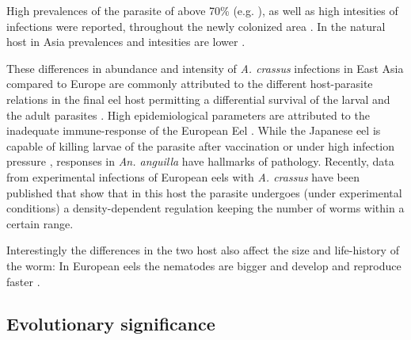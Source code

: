 High prevalences of the parasite of above 70\%
(e.g. \cite{wrtz_distribution_1998}), as well as high intesities of
infections were reported, throughout the newly colonized area
\cite{lefebvre_anguillicolosis:_2004}. In the natural host in Asia
prevalences and intesities are lower \cite{mnderle_occurrence_2006}.

These differences in abundance and intensity of \textit{A. crassus}
infections in East Asia compared to Europe are commonly attributed to
the different host-parasite relations in the final eel host permitting
a differential survival of the larval and the adult parasites
\cite{knopf_differences_2004}. High epidemiological parameters are
attributed to the inadequate immune-response of the European Eel
\cite{knopf_swimbladder_2006}.  While the Japanese eel is capable of
killing larvae of the parasite after vaccination
\cite{knopf_vaccination_2008} or under high infection pressure
\cite{heitlinger_massive_2009}, responses in \textit{An. anguilla}
have hallmarks of pathology. Recently, data from experimental
infections of European eels with \textit{A. crassus} have been
published \cite{fazio_regulation_2008} that show that in this host the
parasite undergoes (under experimental conditions) a density-dependent
regulation keeping the number of worms within a certain range.

Interestingly the differences in the two host also affect the size and
life-history of the worm: In European eels the nematodes are bigger
and develop and reproduce faster \cite{knopf_differences_2004}.



\subsection{Evolutionary significance}
\label{ev-sig}


